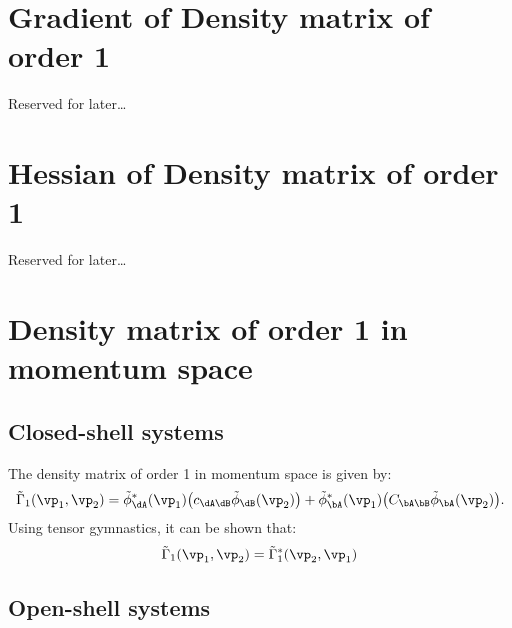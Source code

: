 \section{{\color{red}Gradient of Density matrix of order 1}}

Reserved for later\dots

\section{{\color{red}Hessian of Density matrix of order 1}}

Reserved for later\dots

\section{Density matrix of order 1 in momentum space}
\subsection{Closed-shell systems}
The density matrix of order 1 in momentum space is given by:
%
\begin{equation}
   \tilde\Gamma_1(\vp_1,\vp_2)=\tilde\phi_{\dA}^*(\vp_1)
   \big(c_{\dA\dB}\tilde\phi_{\dB}(\vp_2)\big)
   +\tilde\phi_{\bA}^*(\vp_1)\big(C_{\bA\bB}\tilde\phi_{\bA}(\vp_2)\big).
\end{equation}
%
Using tensor gymnastics, it can be shown that:
%
\begin{equation}\label{eq:conjproptg1p1p2}
   \tilde\Gamma_1(\vp_1,\vp_2)=\tilde\Gamma_1^*(\vp_2,\vp_1)
\end{equation}
%
\subsection{Open-shell systems}

